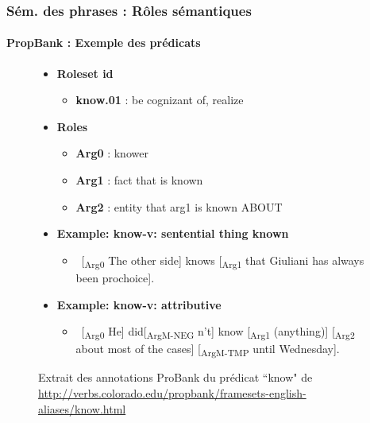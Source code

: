 \documentclass[xcolor=table]{beamer}
\begin{document}
\begin{frame}
\frametitle{Sém. des phrases : Rôles sémantiques}
\framesubtitle{PropBank : Exemple des prédicats}
	
\vspace{-6pt}
\begin{figure}
	\scriptsize
	\begin{tcolorbox}[colback=white, colframe=blue, boxrule=1pt, text width=.91\textwidth]
	\begin{itemize}
		\item \textbf{Roleset id}
		\begin{itemize}\scriptsize
			\item \textbf{know.01} : be cognizant of, realize
		\end{itemize}
		\item \textbf{Roles}
		\begin{itemize}\scriptsize
			\item \textbf{Arg0} : knower
			\item \textbf{Arg1} : fact that is known
			\item \textbf{Arg2} : entity that arg1 is known ABOUT
		\end{itemize}
	
		\item \textbf{Example: know-v: sentential thing known}
		\begin{itemize}\scriptsize
			\item \ [\textsubscript{\color{red}Arg0} The other side] knows [\textsubscript{\color{red}Arg1} that Giuliani has always been prochoice].
		\end{itemize}
	
		\item \textbf{Example: know-v: attributive}
		\begin{itemize}\scriptsize
			\item \ [\textsubscript{\color{red}Arg0} He] did[\textsubscript{\color{red}ArgM-NEG} n't] know [\textsubscript{\color{red}Arg1} (anything)] [\textsubscript{\color{red}Arg2} about most of the cases] [\textsubscript{\color{red}ArgM-TMP} until Wednesday].
		\end{itemize}
	\end{itemize}
	\end{tcolorbox}
		
	\caption{Extrait des annotations ProBank du prédicat ``know" de \url{http://verbs.colorado.edu/propbank/framesets-english-aliases/know.html}}
\end{figure}
	
\end{frame}
\end{document}
